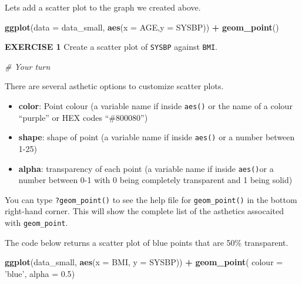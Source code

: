 \documentclass[
]{article}
\newenvironment{Shaded}{\begin{snugshade}}{\end{snugshade}}
\newcommand{\CommentTok}[1]{\textcolor[rgb]{0.56,0.35,0.01}{\textit{#1}}}
\newcommand{\DataTypeTok}[1]{\textcolor[rgb]{0.13,0.29,0.53}{#1}}
\newcommand{\FloatTok}[1]{\textcolor[rgb]{0.00,0.00,0.81}{#1}}
\newcommand{\KeywordTok}[1]{\textcolor[rgb]{0.13,0.29,0.53}{\textbf{#1}}}
\newcommand{\NormalTok}[1]{#1}
\newcommand{\OperatorTok}[1]{\textcolor[rgb]{0.81,0.36,0.00}{\textbf{#1}}}
\newcommand{\StringTok}[1]{\textcolor[rgb]{0.31,0.60,0.02}{#1}}
\providecommand{\tightlist}{%
  \setlength{\itemsep}{0pt}\setlength{\parskip}{0pt}}
\begin{document}
Lets add a scatter plot to the graph we created above.

\begin{Shaded}
\begin{Highlighting}[]
\KeywordTok{ggplot}\NormalTok{(}\DataTypeTok{data =}\NormalTok{ data_small, }
       \KeywordTok{aes}\NormalTok{(}\DataTypeTok{x =}\NormalTok{ AGE,}\DataTypeTok{y =}\NormalTok{ SYSBP))  }\OperatorTok{+}\StringTok{ }
\StringTok{  }\KeywordTok{geom_point}\NormalTok{()}
\end{Highlighting}
\end{Shaded}

\textbf{EXERCISE 1} Create a scatter plot of \texttt{SYSBP} against
\texttt{BMI}.

\begin{Shaded}
\begin{Highlighting}[]
\CommentTok{# Your turn}
\end{Highlighting}
\end{Shaded}

There are several asthetic options to customize scatter plots.

\begin{itemize}
\tightlist
\item
  \textbf{color}: Point colour (a variable name if inside \texttt{aes()}
  or the name of a colour ``purple'' or HEX codes ``\#800080'')
\item
  \textbf{shape}: shape of point (a variable name if inside
  \texttt{aes()} or a number between 1-25)
\item
  \textbf{alpha}: transparency of each point (a variable name if inside
  \texttt{aes()}or a number between 0-1 with 0 being completely
  transparent and 1 being solid)
\end{itemize}

You can type \texttt{?geom\_point()} to see the help file for
\texttt{geom\_point()} in the bottom right-hand corner. This will show
the complete list of the asthetics assocaited with \texttt{geom\_point}.

The code below returns a scatter plot of blue points that are 50\%
transparent.

\begin{Shaded}
\begin{Highlighting}[]
\KeywordTok{ggplot}\NormalTok{(data_small, }
       \KeywordTok{aes}\NormalTok{(}\DataTypeTok{x =}\NormalTok{ BMI, }\DataTypeTok{y =}\NormalTok{ SYSBP)) }\OperatorTok{+}\StringTok{ }
\StringTok{  }\KeywordTok{geom_point}\NormalTok{( }\DataTypeTok{colour =} \StringTok{'blue'}\NormalTok{, }
              \DataTypeTok{alpha =} \FloatTok{0.5}\NormalTok{)}
\end{Highlighting}
\end{Shaded}
\end{document}

